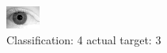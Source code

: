 \begin{figure}[h!]
\begin{center}
\includegraphics[width=0.60\columnwidth]{figures/ID2184_class_4_target_3.png}
\end{center}
\caption{ Classification: 4 actual target: 3}
\label{fig:ID2184_class_4_target_3}
\end{figure}
